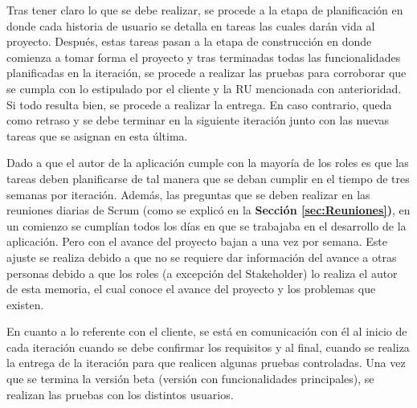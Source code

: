 Tras tener claro lo que se debe realizar, se procede a la etapa de planificación en donde cada historia de usuario se detalla en tareas las cuales darán vida al proyecto. Después, estas tareas pasan a la etapa de construcción en donde comienza a tomar forma el proyecto y tras terminadas todas las funcionalidades planificadas en la iteración, se procede a realizar las pruebas para corroborar que se cumpla con lo estipulado por el cliente y la RU mencionada con anterioridad. Si todo resulta bien, se procede a realizar la entrega. En caso contrario, queda como retraso y se debe terminar en la siguiente iteración junto con las nuevas tareas que se asignan en esta última.

Dado a que el autor de la aplicación cumple con la mayoría de los roles es que las tareas deben planificarse de tal manera que se deban cumplir en el tiempo de tres semanas por iteración. Además, las preguntas que se deben realizar en las reuniones diarias de Scrum (como se explicó en la \textbf{Sección \ref{sec:Reuniones})}, en un comienzo se cumplían todos los días en que se trabajaba en el desarrollo de la aplicación. Pero con el avance del proyecto bajan a una vez por semana. Este ajuste se realiza debido a que no se requiere dar información del avance a otras personas debido a que los roles (a excepción del Stakeholder) lo realiza el autor de esta memoria, el cual conoce el avance del proyecto y los problemas que existen.

En cuanto a lo referente con el cliente, se está en comunicación con él al inicio de cada iteración cuando se debe confirmar los requisitos y al final, cuando se realiza la entrega de la iteración para que realicen algunas pruebas controladas. Una vez que se termina la versión beta (versión con funcionalidades principales), se realizan las pruebas con los distintos usuarios.